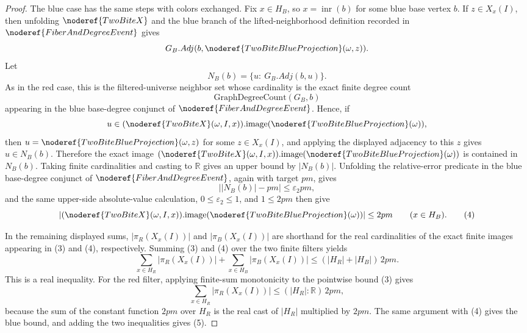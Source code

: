 \begin{proof}
The blue case has the same steps with colors exchanged.  Fix
\(x\in H_B\), so \(x=\operatorname{inr}(b)\) for some blue base vertex \(b\).
If \(z\in X_x(I)\), then unfolding \(\noderef{TwoBiteX}\) and the blue branch
of the lifted-neighborhood definition recorded in
\(\noderef{FiberAndDegreeEvent}\) gives
\[
G_B.Adj(b,\noderef{TwoBiteBlueProjection}(\omega,z)).
\]
Let
\[
N_B(b)=\{u:\ G_B.Adj(b,u)\}.
\]
As in the red case, this is the filtered-universe neighbor set whose
cardinality is the exact finite degree count
\[
\mathrm{GraphDegreeCount}(G_B,b)
\]
appearing in the blue base-degree conjunct of
\(\noderef{FiberAndDegreeEvent}\).  Hence, if
\[
u\in(\noderef{TwoBiteX}(\omega,I,x)).\mathrm{image}
      (\noderef{TwoBiteBlueProjection}(\omega)),
\]
then \(u=\noderef{TwoBiteBlueProjection}(\omega,z)\) for some \(z\in X_x(I)\),
and applying the displayed adjacency to this \(z\) gives \(u\in N_B(b)\).
Therefore the exact image
\((\noderef{TwoBiteX}(\omega,I,x)).\mathrm{image}
      (\noderef{TwoBiteBlueProjection}(\omega))\) is contained in \(N_B(b)\).
Taking finite cardinalities and casting to \(\mathbb R\) gives an upper bound
by \(|N_B(b)|\).  Unfolding the relative-error predicate in the blue
base-degree conjunct of \(\noderef{FiberAndDegreeEvent}\), again with target
\(pm\), gives
\[
\bigl||N_B(b)|-pm\bigr|\le\varepsilon_2pm,
\]
and the same upper-side absolute-value calculation, \(0\le\varepsilon_2\le1\),
and \(1\le2pm\) then give
\[
|(\noderef{TwoBiteX}(\omega,I,x)).\mathrm{image}
      (\noderef{TwoBiteBlueProjection}(\omega))|
\le2pm \qquad (x\in H_B). \tag{4}
\]

In the remaining displayed sums, \(|\pi_R(X_x(I))|\) and
\(|\pi_B(X_x(I))|\) are shorthand for the real cardinalities of the exact
finite images appearing in (3) and (4), respectively.
Summing (3) and (4) over the two finite filters yields
\[
\sum_{x\in H_R}|\pi_R(X_x(I))|
+
\sum_{x\in H_B}|\pi_B(X_x(I))|
\le (|H_R|+|H_B|)\,2pm. \tag{5}
\]
This is a real inequality.  For the red filter, applying finite-sum
monotonicity to the pointwise bound (3) gives
\[
\sum_{x\in H_R}|\pi_R(X_x(I))|
\le (|H_R|:\mathbb R)\,2pm,
\]
because the sum of the constant function \(2pm\) over \(H_R\) is the real cast
of \(|H_R|\) multiplied by \(2pm\).  The same argument with (4) gives the blue
bound, and adding the two inequalities gives (5).


\end{proof}
